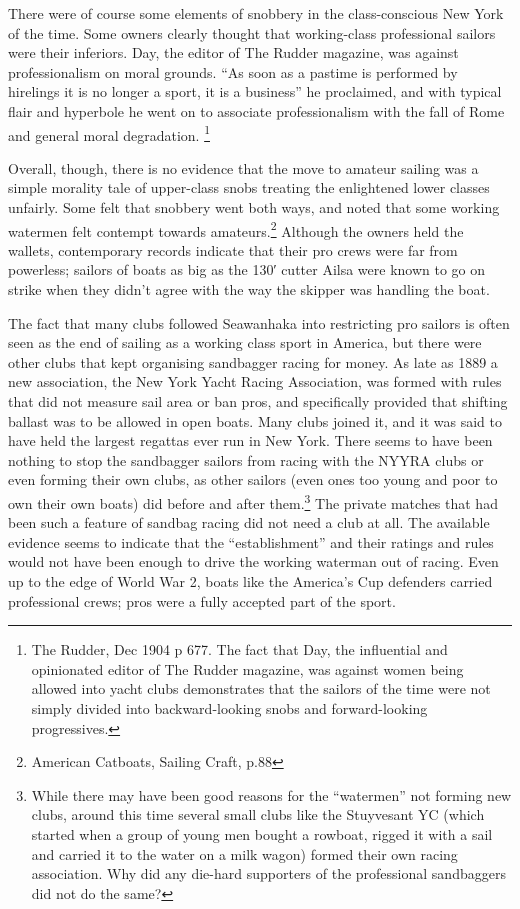 \documentclass[
  letterpaper,
]{scrbook}
\begin{document}
There were of course some elements of snobbery in the class-conscious
New York of the time. Some owners clearly thought that working-class
professional sailors were their inferiors. Day, the editor of The Rudder
magazine, was against professionalism on moral grounds. ``As soon as a
pastime is performed by hirelings it is no longer a sport, it is a
business'' he proclaimed, and with typical flair and hyperbole he went
on to associate professionalism with the fall of Rome and general moral
degradation. \footnote{The Rudder, Dec 1904 p 677. The fact that Day,
  the influential and opinionated editor of The Rudder magazine, was
  against women being allowed into yacht clubs demonstrates that the
  sailors of the time were not simply divided into backward-looking
  snobs and forward-looking progressives.}

Overall, though, there is no evidence that the move to amateur sailing
was a simple morality tale of upper-class snobs treating the enlightened
lower classes unfairly. Some felt that snobbery went both ways, and
noted that some working watermen felt contempt towards
amateurs.\footnote{American Catboats, Sailing Craft, p.88} Although the
owners held the wallets, contemporary records indicate that their pro
crews were far from powerless; sailors of boats as big as the 130′
cutter Ailsa were known to go on strike when they didn't agree with the
way the skipper was handling the boat.

The fact that many clubs followed Seawanhaka into restricting pro
sailors is often seen as the end of sailing as a working class sport in
America, but there were other clubs that kept organising sandbagger
racing for money. As late as 1889 a new association, the New York Yacht
Racing Association, was formed with rules that did not measure sail area
or ban pros, and specifically provided that shifting ballast was to be
allowed in open boats. Many clubs joined it, and it was said to have
held the largest regattas ever run in New York. There seems to have been
nothing to stop the sandbagger sailors from racing with the NYYRA clubs
or even forming their own clubs, as other sailors (even ones too young
and poor to own their own boats) did before and after them.\footnote{While
  there may have been good reasons for the ``watermen'' not forming new
  clubs, around this time several small clubs like the Stuyvesant YC
  (which started when a group of young men bought a rowboat, rigged it
  with a sail and carried it to the water on a milk wagon) formed their
  own racing association. Why did any die-hard supporters of the
  professional sandbaggers did not do the same?} The private matches
that had been such a feature of sandbag racing did not need a club at
all. The available evidence seems to indicate that the ``establishment''
and their ratings and rules would not have been enough to drive the
working waterman out of racing. Even up to the edge of World War 2,
boats like the America's Cup defenders carried professional crews; pros
were a fully accepted part of the sport.
\end{document}
